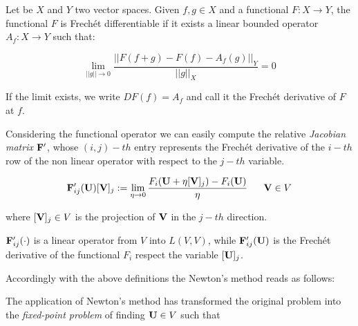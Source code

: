 \begin{Definizione}
Let be $X$ and $Y$ two vector spaces. Given $f,g \in X$ and a functional $F:X\rightarrow Y$, the functional $F$ is Frech\'et differentiable if it exists a linear bounded operator $A_f:X\rightarrow Y$ such that:

\begin{equation}
\lim_{||g||\to 0}\dfrac{||F(f+g)-F(f)-A_f(g)||_Y}{||g||_X} = 0 
\end{equation}

If the limit exists, we write $DF(f)=A_f$ and call it the Frech\'et derivative of $F$ at $f$.
\end{Definizione}


Considering the functional operator  we can easily compute the relative \textit{Jacobian matrix} $\mathbf{F}'$, whose $(i,j)-th$ entry represents the Frech\'et derivative of the $i-th$ row of the non linear operator with respect to the $j-th$ variable.

\begin{equation}
\vect{F}'_{ij}(\vect{U})[\vect{V}]_j := \lim_{\eta \to 0}\dfrac{F_i(\vect{U}+\eta [\vect{V}]_j)-F_i(\vect{U})}{\eta}  \psp{10} \vect{V} \in V
\end{equation}

where $[\mathbf{V}]_j \in V$ is the projection  of  $\mathbf{V}$ in the $j-th$ direction. 

$\mathbf{F}'_{ij}(\cdot)$ is a linear operator from $V$ into $L(V,V)$, while $\mathbf{F}'_{ij}(\mathbf{U})$ is the Frech\'et derivative of the functional $F_i$ respect the variable $[\mathbf{U}]_j$.

Accordingly with the above definitions the Newton's method reads as follows:


\vspace{0.3cm}
The application of Newton's method has transformed the original problem  into the \textit{fixed-point problem} of finding $\mathbf{U} \in V$ such that

